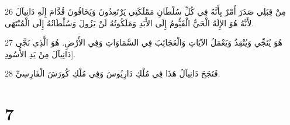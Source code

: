 \par 26 مِنْ قِبَلِي صَدَرَ أَمْرٌ بِأَنَّهُ فِي كُلِّ سُلْطَانِ مَمْلَكَتِي يَرْتَعِدُونَ وَيَخَافُونَ قُدَّامَ إِلَهِ دَانِيآلَ لأَنَّهُ هُوَ الإِلَهُ الْحَيُّ الْقَيُّومُ إِلَى الأَبَدِ وَمَلَكُوتُهُ لَنْ يَزُولَ وَسُلْطَانُهُ إِلَى الْمُنْتَهَى.
\par 27 هُوَ يُنَجِّي وَيُنْقِذُ وَيَعْمَلُ الآيَاتِ وَالْعَجَائِبَ فِي السَّمَاوَاتِ وَفِي الأَرْضِ. هُوَ الَّذِي نَجَّى دَانِيآلَ مِنْ يَدِ الأُسُودِ].
\par 28 فَنَجَحَ دَانِيآلُ هَذَا فِي مُلْكِ دَارِيُوسَ وَفِي مُلْكِ كُورَشَ الْفَارِسِيِّ.

\chapter{7}

